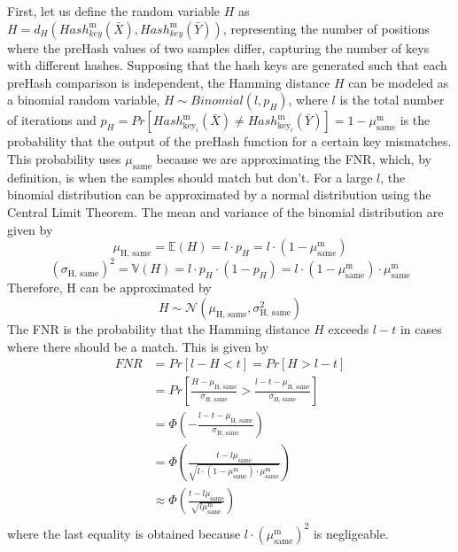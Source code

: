 First, let us define the random variable $H$ as \(H = d_H(Hash_{key}^\text{m}(\bar{X}), Hash_{key}^\text{m}(\bar{Y}))\), representing the number of positions where the preHash values of two samples differ, capturing the number of keys with different hashes. Supposing that the hash keys are generated such that each preHash comparison is independent, the Hamming distance $H$ can be modeled as a binomial random variable, \(H \sim Binomial(l, p_H)\), where $l$ is the total number of iterations and $p_H = Pr[Hash_{\text{key}_i}^\text{m}(\bar{X}) \neq Hash_{\text{key}_i}^\text{m}(\bar{Y})] = 1 - \mu_{\text{same}}^\text{m}$ is the probability that the output of the preHash function for a certain key mismatches. This probability uses $\mu_{\text{same}}$ because we are approximating the FNR, which, by definition, is when the samples should match but don't. 
\newline For a large $l$, the binomial distribution can be approximated by a normal distribution using the Central Limit Theorem. The mean and variance of the binomial distribution are given by
\[
\mu_{\text{H, same}} = \mathbb{E}(H) = l \cdot p_H = l \cdot (1 - \mu_{\text{same}}^\text{m})    
\]
\[
(\sigma_{\text{H, same}})^2 = \mathbb{V}(H) = l \cdot p_H \cdot (1 - p_H) = l \cdot (1 - \mu_{\text{same}}^\text{m}) \cdot \mu_{\text{same}}^\text{m}    
\]
Therefore, H can be approximated by
\[
H \sim \mathcal{N}(\mu_{\text{H, same}}, \sigma_{\text{H, same}}^\text{2})    
\]
The FNR is the probability that the Hamming distance $H$ exceeds $l - t$ in cases where there should be a match. This is given by
\begin{equation}
    \begin{aligned}
        \label{eq:fnr}
        FNR &= Pr[l - H < t] = Pr[H > l - t] \\
        &= Pr\left[\frac{H - \mu_{\text{H, same}}}{\sigma_{\text{H, same}}} > \frac{l - t - \mu_{\text{H, same}}}{\sigma_{\text{H, same}}}\right] \\
        &= \Phi \left( - \frac{l - t - \mu_{\text{H, same}}}{\sigma_{\text{H, same}}}\right) \\
        &= \Phi \left(\frac{t - l\mu_{\text{same}}}{\sqrt{l \cdot (1 - \mu_{\text{same}}^\text{m}) \cdot \mu_{\text{same}}^\text{m}}}\right) \\
        &\approx \Phi \left(\frac{t - l\mu_{\text{same}}}{\sqrt{l\mu_{\text{same}}^\text{m}}}\right) \\
    \end{aligned}        
\end{equation}
where the last equality is obtained because $l\cdot(\mu_{\text{same}}^\text{m})^2$ is negligeable. 

